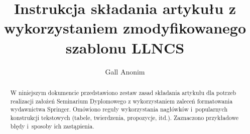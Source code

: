 

\title{Instrukcja składania artykułu z wykorzystaniem zmodyfikowanego szablonu LLNCS}
\author{Gall Anonim}



\maketitle

\begin{abstract}
	W niniejszym dokumencie przedstawiono zestaw zasad składania artykułu dla potrzeb realizacji założeń Seminarium Dyplomowego z wykorzystaniem zaleceń formatowania wydawnictwa Springer. Omówiono reguły wykorzystania nagłówków i~popularnych konstrukcji tekstowych (tabele, twierdzenia, propozycje, itd.). Zaznaczono przykładowe błędy i~sposoby ich zastąpienia.

\end{abstract}




\begin{thebibliography}{}

\end{thebibliography}


